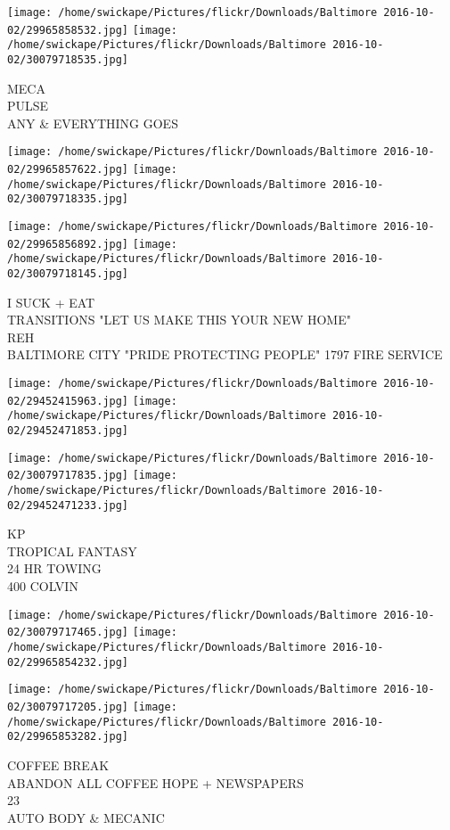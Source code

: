 \documentclass[10pt,letterpaper]{article}
\begin{document}
\vspace{0.25in}
\texttt{[image: /home/swickape/Pictures/flickr/Downloads/Baltimore 2016-10-02/29965858532.jpg]}
\texttt{[image: /home/swickape/Pictures/flickr/Downloads/Baltimore 2016-10-02/30079718535.jpg]}

MECA\\
PULSE\\
ANY \& EVERYTHING GOES
\pagebreak

\texttt{[image: /home/swickape/Pictures/flickr/Downloads/Baltimore 2016-10-02/29965857622.jpg]}
\texttt{[image: /home/swickape/Pictures/flickr/Downloads/Baltimore 2016-10-02/30079718335.jpg]}

\texttt{[image: /home/swickape/Pictures/flickr/Downloads/Baltimore 2016-10-02/29965856892.jpg]}
\texttt{[image: /home/swickape/Pictures/flickr/Downloads/Baltimore 2016-10-02/30079718145.jpg]}

I SUCK + EAT\\
TRANSITIONS "LET US MAKE THIS YOUR NEW HOME"\\
REH\\
BALTIMORE CITY "PRIDE PROTECTING PEOPLE" 1797 FIRE SERVICE
\pagebreak

\texttt{[image: /home/swickape/Pictures/flickr/Downloads/Baltimore 2016-10-02/29452415963.jpg]}
\texttt{[image: /home/swickape/Pictures/flickr/Downloads/Baltimore 2016-10-02/29452471853.jpg]}

\texttt{[image: /home/swickape/Pictures/flickr/Downloads/Baltimore 2016-10-02/30079717835.jpg]}
\texttt{[image: /home/swickape/Pictures/flickr/Downloads/Baltimore 2016-10-02/29452471233.jpg]}

KP\\
TROPICAL FANTASY\\
24 HR TOWING\\
400 COLVIN
\pagebreak

\texttt{[image: /home/swickape/Pictures/flickr/Downloads/Baltimore 2016-10-02/30079717465.jpg]}
\texttt{[image: /home/swickape/Pictures/flickr/Downloads/Baltimore 2016-10-02/29965854232.jpg]}

\texttt{[image: /home/swickape/Pictures/flickr/Downloads/Baltimore 2016-10-02/30079717205.jpg]}
\texttt{[image: /home/swickape/Pictures/flickr/Downloads/Baltimore 2016-10-02/29965853282.jpg]}

COFFEE BREAK\\
ABANDON ALL COFFEE HOPE + NEWSPAPERS\\
23\\
AUTO BODY \& MECANIC
\pagebreak
\end{document}
